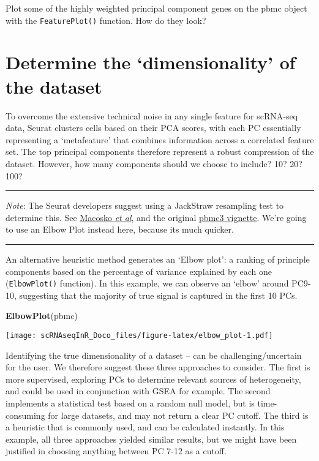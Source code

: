 \documentclass[
]{book}
\newenvironment{Shaded}{\begin{snugshade}}{\end{snugshade}}
\newcommand{\FunctionTok}[1]{\textcolor[rgb]{0.13,0.29,0.53}{\textbf{#1}}}
\newcommand{\NormalTok}[1]{#1}
\begin{document}
Plot some of the highly weighted principal component genes on the pbmc object with the \texttt{FeaturePlot()} function. How do they look?

\hypertarget{determine-the-dimensionality-of-the-dataset}{%
\section{Determine the `dimensionality' of the dataset}\label{determine-the-dimensionality-of-the-dataset}}

To overcome the extensive technical noise in any single feature for scRNA-seq data, Seurat clusters cells based on their PCA scores, with each PC essentially representing a `metafeature' that combines information across a correlated feature set. The top principal components therefore represent a robust compression of the dataset. However, how many components should we choose to include? 10? 20? 100?

\begin{center}\rule{0.5\linewidth}{0.5pt}\end{center}

\emph{Note}: The Seurat developers suggest using a JackStraw resampling test to determine this. See \href{http://www.cell.com/abstract/S0092-8674(15)00549-8}{Macosko \emph{et al}}, and the original \href{https://satijalab.org/seurat/articles/pbmc3k_tutorial.html\#determine-the-dimensionality-of-the-dataset-1}{pbmc3 vignette}. We're going to use an Elbow Plot instead here, because its much quicker.

\begin{center}\rule{0.5\linewidth}{0.5pt}\end{center}

An alternative heuristic method generates an `Elbow plot': a ranking of principle components based on the percentage of variance explained by each one (\texttt{ElbowPlot()} function). In this example, we can observe an `elbow' around PC9-10, suggesting that the majority of true signal is captured in the first 10 PCs.

\begin{Shaded}
\begin{Highlighting}[]
\FunctionTok{ElbowPlot}\NormalTok{(pbmc)}
\end{Highlighting}
\end{Shaded}

\texttt{[image: scRNAseqInR\_Doco\_files/figure-latex/elbow\_plot-1.pdf]}

Identifying the true dimensionality of a dataset -- can be challenging/uncertain for the user. We therefore suggest these three approaches to consider. The first is more supervised, exploring PCs to determine relevant sources of heterogeneity, and could be used in conjunction with GSEA for example. The second implements a statistical test based on a random null model, but is time-consuming for large datasets, and may not return a clear PC cutoff. The third is a heuristic that is commonly used, and can be calculated instantly. In this example, all three approaches yielded similar results, but we might have been justified in choosing anything between PC 7-12 as a cutoff.
\end{document}
